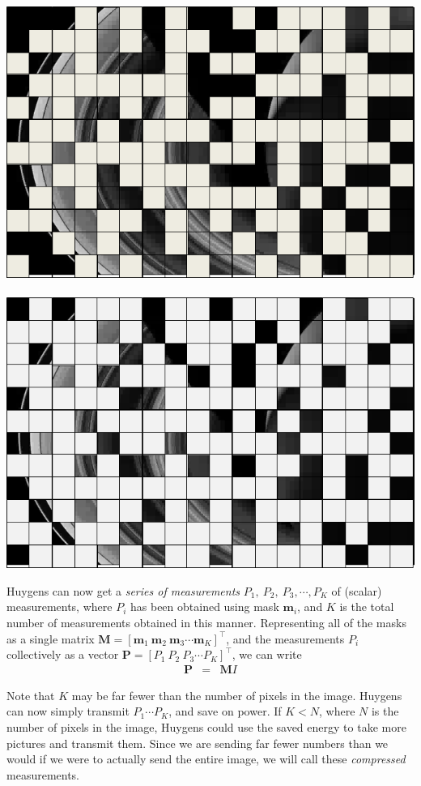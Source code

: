 \begin{enumerate}
\begin{center}
\includegraphics[scale=0.4]{figs/saturnmask2.png} $\qquad$ \includegraphics[scale=0.4]{figs/saturnmask3.png}
\end{center}

Huygens can now get a \textit{series of measurements} $P_1,~P_2,~P_3,\cdots,P_K$ of (scalar) measurements, where $P_i$ has been obtained using mask $\mathbf{m}_i$, and $K$ is the total number of measurements obtained in this manner. Representing all of the masks as a single matrix $\mathbf{M} = [\mathbf{m}_1~\mathbf{m}_2~\mathbf{m}_3\cdots\mathbf{m}_K]^\top$, and the measurements $P_i$ collectively as a vector $\mathbf{P} = [P_1~P_2~P_3\cdots P_K]^\top$, we can write
\begin{eqnarray}
\mathbf{P} & = & \mathbf{M}I
\end{eqnarray}

Note that $K$ may be far fewer than the number of pixels in the image. Huygens can now simply transmit $P_1 \cdots P_K$, and save on power. If $K < N$, where $N$ is the number of pixels in the image, Huygens could use the saved energy to take more pictures and transmit them. Since we are sending far fewer numbers than we would if we were to actually send the entire image, we will call these \textit{compressed} measurements.


\end{enumerate}
